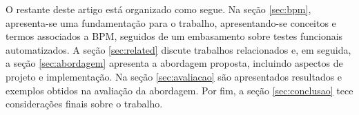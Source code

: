 \documentclass[12pt]{article}
\begin{document}
O restante deste artigo está organizado como segue. Na seção \ref{sec:bpm}, apresenta-se uma fundamentação para o trabalho, apresentando-se conceitos e termos associados a BPM, seguidos de um embasamento sobre testes funcionais automatizados. A seção \ref{sec:related} discute trabalhos relacionados e, em seguida, a seção  \ref{sec:abordagem} apresenta a abordagem proposta, incluindo aspectos de projeto e implementação. Na seção \ref{sec:avaliacao} são apresentados resultados e exemplos obtidos na avaliação da abordagem. Por fim, a seção \ref{sec:conclusao} tece considerações finais sobre o trabalho.





\end{document}
